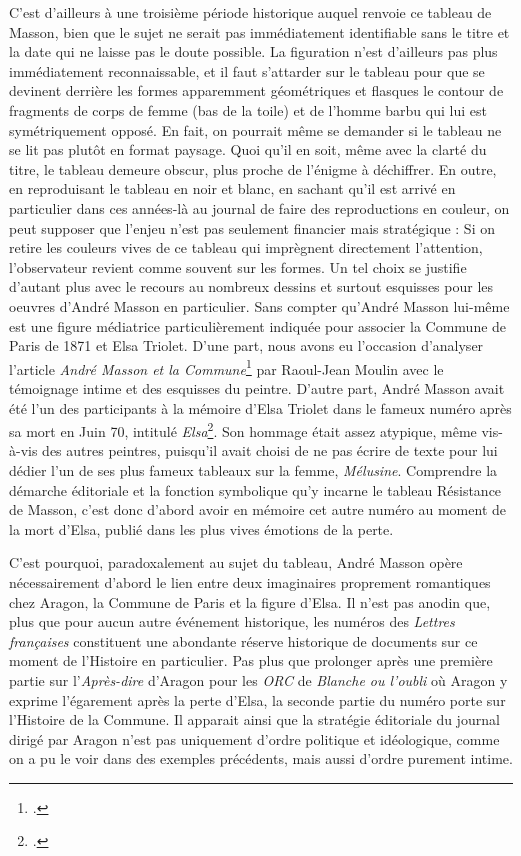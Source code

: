 C’est d’ailleurs à une troisième période historique auquel renvoie ce tableau de Masson, bien que le sujet ne serait pas immédiatement identifiable sans le titre et la date qui ne laisse pas le doute possible. La figuration n’est d’ailleurs pas plus immédiatement reconnaissable, et il faut s’attarder sur le tableau pour que se devinent derrière les formes apparemment géométriques et flasques le contour de fragments de corps de femme (bas de la toile) et de l’homme barbu qui lui est symétriquement opposé. En fait, on pourrait même se demander si le tableau ne se lit pas plutôt en format paysage. Quoi qu’il en soit, même avec la clarté du titre, le tableau demeure obscur, plus proche de l’énigme à déchiffrer. En outre, en reproduisant le tableau en noir et blanc, en sachant qu’il est arrivé en particulier dans ces années-là au journal de faire des reproductions en couleur, on peut supposer que l’enjeu n’est pas seulement financier mais stratégique : Si on retire les couleurs vives de ce tableau qui imprègnent directement l’attention, l’observateur revient comme souvent sur les formes. Un tel choix se justifie d’autant plus avec le recours au nombreux dessins et surtout esquisses pour les oeuvres d’André Masson en particulier. Sans compter qu’André Masson lui-même est une figure médiatrice particulièrement indiquée pour associer la Commune de Paris de 1871 et Elsa Triolet. D’une part, nous avons eu l’occasion d’analyser l’article \emph{André Masson et la Commune}\footcite{commune} par  Raoul-Jean Moulin avec le témoignage intime et des esquisses du peintre. D’autre part, André Masson avait été l’un des participants à la mémoire d’Elsa Triolet dans le fameux numéro après sa mort en Juin 70, intitulé \emph{Elsa}\footcite{specialelsa}. Son hommage était assez atypique, même vis-à-vis des autres peintres, puisqu’il avait choisi de ne pas écrire de texte pour lui dédier l’un de ses plus fameux  tableaux sur la femme, \emph{Mélusine}. Comprendre la démarche éditoriale et la fonction symbolique qu’y incarne le tableau Résistance de Masson, c’est donc d’abord avoir en mémoire cet autre numéro au moment de la mort d’Elsa, publié dans les plus vives émotions de la perte.


C’est pourquoi, paradoxalement au sujet du tableau, André Masson opère nécessairement d’abord le lien entre deux imaginaires proprement romantiques chez Aragon, la Commune de Paris et la figure d’Elsa. Il n’est pas anodin que, plus que pour aucun autre événement historique, les numéros des \emph{Lettres françaises} constituent une abondante réserve historique de documents sur ce moment de l’Histoire en particulier. Pas plus que prolonger après une première partie sur l’\emph{Après-dire} d’Aragon pour les \emph{ORC} de \emph{Blanche ou l’oubli} où Aragon y exprime l’égarement après la perte d’Elsa, la seconde partie du numéro porte sur l’Histoire de la Commune. Il apparait ainsi que la stratégie éditoriale du journal dirigé par Aragon n’est pas uniquement d’ordre politique et idéologique, comme on a pu le voir dans des exemples précédents, mais aussi d’ordre purement intime. 


